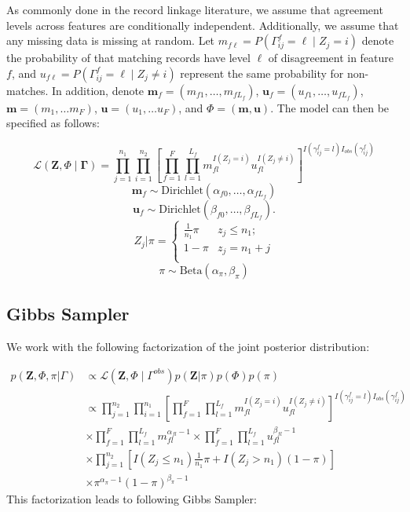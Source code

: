 \documentclass[12pt,letterpaper]{article}
\newcommand{\1}[1]{\mathbb{I}\!\left[#1\right]} %
\begin{document}
As commonly done in the record linkage literature, we assume that agreement levels across features are conditionally independent. Additionally, we assume that any missing data is missing at random. Let  $m_{f\ell} = P(\Gamma_{ij}^f = \ell \mid Z_j = i)$ denote the probability of that matching records have level $\ell$ of disagreement in feature $f$, and $u_{f\ell} = P(\Gamma_{ij}^f = \ell \mid Z_j \neq i)$ represent the same probability for non-matches. In addition, denote $\bm{m}_f = (m_{f1}, \ldots, m_{fL_f})$, $\bm{u}_f = (u_{f1}, \ldots, u_{fL_f})$, $\bm{m}= (m_1, \ldots m_F)$, $\bm{u}= (u_1, \ldots u_F)$, and $\Phi = (\bm{m}, \bm{u})$.
The model can then be specified as follows:

$$\mathcal{L}(\bm{Z}, \Phi \mid \bm{\Gamma}) = \prod_{j=1}^{n_1}  \prod_{i=1}^{n_2}\left[ \prod_{f=1}^{F}\prod_{l=1}^{L_f} m_{fl}^{I(Z_j = i)}u_{fl}^{I(Z_j \neq i)}\right]^{I(\gamma_{ij}^f = l)I_{obs}(\gamma_{ij}^f)}$$
$$\bm{m}_f \sim \text{Dirichlet}(\alpha_{f0}, \ldots, \alpha_{f L_f})$$
$$\bm{u}_f \sim \text{Dirichlet}(\beta_{f0}, \ldots, \beta_{f L_f}).$$
$$Z_j | \pi =
\begin{cases} 
	\frac{1}{n_1}\pi  & z_j \leq n_1; \\
	1-\pi &  z_j  = n_1 + j \\
\end{cases}$$
$$\pi \sim \text{Beta}(\alpha_{\pi}, \beta_{\pi})$$

\hypertarget{posterior-sampling}{%
	\subsection{Gibbs Sampler}
	\label{gibbs_sampling}}
We work with the following factorization of the joint posterior distribution:

\begin{align*}
	p(\bm{Z}, \Phi, \pi|\Gamma) &\propto \mathcal{L}(\bm{Z}, \Phi \mid \Gamma^{obs}) p(\bm{Z} | \pi) p(\Phi) p(\pi) \\
	&\propto \prod_{j=1}^{n_2}  \prod_{i=1}^{n_1}\left[ \prod_{f=1}^{F}\prod_{l=1}^{L_f} m_{fl}^{I(Z_j = i)}u_{fl}^{I(Z_j \neq i)}\right]^{I(\gamma_{ij}^f = l)I_{obs}(\gamma_{ij}^f)} \\
	&\times  \prod_{f=1}^{F}\prod_{l=1}^{L_f} m_{fl}^{\alpha_{fl} - 1}  \times\prod_{f=1}^{F}\prod_{l=1}^{L_f} u_{fl}^{\beta_{fl} - 1} \\
	&\times \prod_{j=1}^{n_2} \left[I(Z_j \leq n_1)\frac{1}{n_1}\pi + I(Z_j > n_1)(1 - \pi)\right] \\
	&\times \pi^{\alpha_{\pi} -1} (1-\pi)^{\beta_{\pi} -1}
\end{align*}
This factorization leads to following Gibbs Sampler:
\end{document}
